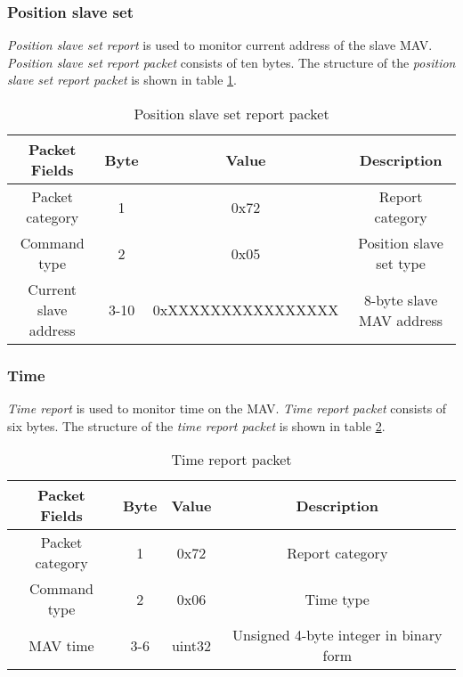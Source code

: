 \subsubsection{Position slave set}
\label{sec:PositionSlaveSetReport}
\textit{Position slave set report} is used to monitor current address of the slave MAV. 
\textit{Position slave set report packet} consists of ten bytes. The structure of the \textit{position slave set report packet} is shown in table \ref{tab:positionSlaveSetReport}.
\begin{table}[H]
\begin{center}
\begin{tabular}{c c c c}
\toprule
\rowcolor[HTML]{FFFC9E} 
\textbf{Packet Fields} & \textbf{Byte} & \textbf{Value}     & \textbf{Description}                     \\ \midrule
Packet category        & 1             & 0x72               & Report category                          \\ [1ex]
Command type           & 2             & 0x05               & Position slave set type                  \\ [1ex]
Current slave address  & 3-10          & 0xXXXXXXXXXXXXXXXX &  8-byte slave MAV address  \\ [1ex] \bottomrule
\end{tabular}
\end{center}
\caption{Position slave set report packet}
\label{tab:positionSlaveSetReport}
\end{table}


\subsubsection{Time}
\label{sec:timeReport}
\textit{Time report} is used to monitor time on the MAV. 
\textit{Time report packet} consists of six bytes. The structure of the \textit{time report packet} is shown in table \ref{tab:timeReport}.
\begin{table}[H]
\begin{center}
\begin{tabular}{c c c c}
\toprule
\rowcolor[HTML]{FFFC9E} 
\textbf{Packet Fields} & \textbf{Byte} & \textbf{Value} & \textbf{Description}           \\ \midrule
Packet category        & 1             & 0x72           & Report category               \\ [1ex]
Command type           & 2             & 0x06           & Time type                      \\ [1ex]
MAV time               & 3-6           & uint32         & Unsigned 4-byte integer in binary form   \\ [1ex] \bottomrule
\end{tabular}
\end{center}
\caption{Time report packet}
\label{tab:timeReport}
\end{table}


